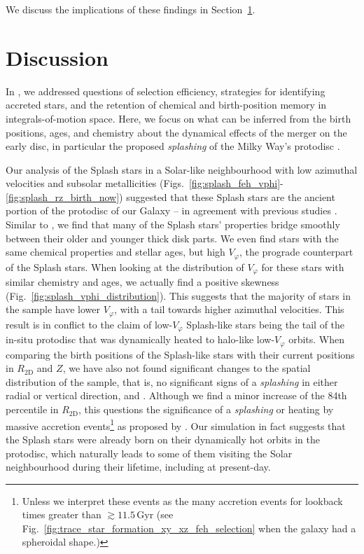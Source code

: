 \documentclass[fleqn,usenatbib]{mnras}
\begin{document}
We discuss the implications of these findings in Section~\ref{sec:discussion}.

\section{Discussion}
\label{sec:discussion}

In , we addressed questions of selection efficiency, strategies for identifying accreted stars, and the retention of chemical and birth-position memory in integrals-of-motion space. Here, we focus on what can be inferred from the birth positions, ages, and chemistry about the dynamical effects of the merger on the early disc, in particular the proposed \textit{splashing} of the Milky Way's protodisc \citep{Belokurov2020}.

Our analysis of the Splash stars in a Solar-like neighbourhood with low azimuthal velocities and subsolar metallicities (Figs.~\ref{fig:splash_feh_vphi}-\ref{fig:splash_rz_birth_now}) suggested that these Splash stars are the ancient portion of the protodisc of our Galaxy -- in agreement with previous studies \citep{Bonaca2017, Haywood2018, DiMatteo2019, Gallart2019, Belokurov2020}. Similar to \citet{Belokurov2020}, we find that many of the Splash stars' properties bridge smoothly between their older and younger thick disk parts. We even find stars with the same chemical properties and stellar ages, but high $V_\varphi$, the prograde counterpart of the Splash stars. When looking at the distribution of $V_\varphi$ for these stars with similar chemistry and ages, we actually find a positive skewness (Fig.~\ref{fig:splash_vphi_distribution}). This suggests that the majority of stars in the sample have lower $V_\varphi$, with a tail towards higher azimuthal velocities. This result is in conflict to the claim of low-$V_\varphi$ Splash-like stars being the tail of the in-situ protodisc that was dynamically heated to halo-like low-$V_\varphi$ orbits. When comparing the birth positions of the Splash-like stars with their current positions in $R_\mathrm{2D}$ and $Z$, we have also not found significant changes to the spatial distribution of the sample, that is, no significant signs of a \textit{splashing} in either radial or vertical direction,  and . Although we find a minor increase of the 84th percentile in $R_\mathrm{2D}$, this questions the significance of a \textit{splashing} or heating by massive accretion events\footnote{Unless we interpret these events as the many accretion events for lookback times greater than $\gtrsim 11.5\,\mathrm{Gyr}$ (see Fig.~\ref{fig:trace_star_formation_xy_xz_feh_selection} when the galaxy had a spheroidal shape.)} as proposed by \citet{Belokurov2020}. Our simulation in fact suggests that the Splash stars were already born on their dynamically hot orbits in the protodisc, which naturally leads to some of them visiting the Solar neighbourhood during their lifetime, including at present-day.
\end{document}
